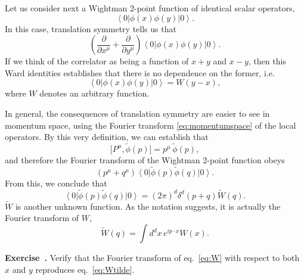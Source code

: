 \documentclass[a4paper,12pt]{article}
\newcommand{\ket}[1]{\left| #1 \right\rangle}
\newcommand{\bra}[1]{\left\langle #1 \right|}
\numberwithin{equation}{section}
\newcounter{exercise}[section]
\newenvironment{exercise}[1][]%
	{\refstepcounter{exercise}\bigskip
	\begin{mdframed}[backgroundcolor=gray!20, linewidth=0]
	\noindent\textbf{Exercise~\thesection.\theexercise #1} \rmfamily}
  	{\end{mdframed}\bigskip}
\begin{document}
Let us consider next a Wightman 2-point function of identical scalar operators,
\begin{equation}
	\bra{0} \phi(x) \phi(y) \ket{0}.
\end{equation}
In this case, translation symmetry tells us that
\begin{equation}
	\left( \frac{\partial}{\partial x^\mu}
	+ \frac{\partial}{\partial y^\mu} \right)
	\bra{0} \phi(x) \phi(y) \ket{0}.
\end{equation}
If we think of the correlator as being a function of $x + y$ and $x - y$, then this Ward identities establishes that there is no dependence on the former, i.e.~
\begin{equation}
	\bra{0} \phi(x) \phi(y) \ket{0} = W(y - x),
	\label{eq:W}
\end{equation}
where $W$ denotes an arbitrary function.

In general, the consequences of translation symmetry are easier to see in momentum space, using the Fourier transform \eqref{eq:momentumspace} of the local operators. By this very definition, we can establish that
\begin{equation}
	\big[ P^\mu, \widetilde{\phi}(p) \big]
	= p^\mu \, \widetilde{\phi}(p),
	\label{eq:commutator:P:momentum}
\end{equation}
and therefore the Fourier transform of the Wightman 2-point function obeys
\begin{equation}
	(p^\mu + q^\mu)
	\bra{0} \widetilde{\phi}(p) \widetilde{\phi}(q) \ket{0}.
\end{equation}
From this, we conclude that
\begin{equation}
	\bra{0} \widetilde{\phi}(p) \widetilde{\phi}(q) \ket{0}
	= (2\pi)^d \delta^d(p + q) \widetilde{W}(q).
	\label{eq:Wtilde}
\end{equation}
$\widetilde{W}$ is another unknown function. As the notation suggests, it is actually the Fourier transform of $W$,
\begin{equation}
	\widetilde{W}(q) = \int d^dx \, e^{i p \cdot x} W(x).
\end{equation}
%
\begin{exercise}
	Verify that the Fourier transform of eq.~\eqref{eq:W}
	with respect to both $x$ and $y$ reproduces eq.~\eqref{eq:Wtilde}.
\end{exercise}
\end{document}
